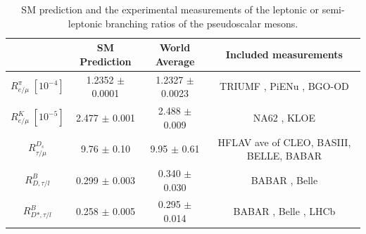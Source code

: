 \begin{table}[ht]
    \setlength{\tabcolsep}{.5 em}
    \renewcommand{\arraystretch}{1.5}
    \centering
    \begin{tabular}{|c|c|c|c|}
        \hline
         & SM Prediction & World Average & Included measurements \\
        \hline
        $R^\pi_{e/\mu} \; [10^{-4}]$ &  1.2352 $\pm$ 0.0001 \cite{Cirigliano:2007xi} & 1.2327 $\pm$ 0.0023  & 
            \tiny{ TRIUMF \cite{Numao:1992ve, Britton:1992pg}, PiENu \cite{Aguilar-Arevalo:2015cdf}, BGO-OD \cite{Czapek:1993kc}} \\
        $R^K_{e/\mu} \; [10^{-5}]$ &  2.477  $\pm$ 0.001 \cite{Cirigliano:2007xi} & 2.488  $\pm$ 0.009 & 
            \tiny{NA62 \cite{Lazzeroni:2012cx}, KLOE \cite{Ambrosino:2009aa} }\\
        $R^{D_s}_{\tau/\mu} $ &  9.76 $\pm$ 0.10 \cite{Dobrescu:2008er} & 9.95 $\pm$ 0.61  & 
            \tiny{ HFLAV \cite{Amhis:2016xyh} ave of CLEO, BASIII, BELLE, BABAR} \\
        
        \hline
        $R^{B}_{D, \tau/l} $ &  0.299  $\pm$ 0.003  \cite{Bifani:2018zmi} & 0.340  $\pm$ 0.030 & 
            \tiny{BABAR \cite{Lees:2012xj, Lees:2013uzd}, Belle \cite{Huschle:2015rga} }\\
            
        $R^{B}_{D*, \tau/l} $ &  0.258  $\pm$ 0.005 \cite{Bifani:2018zmi} & 0.295  $\pm$ 0.014 & 
            \tiny{BABAR \cite{Lees:2012xj, Lees:2013uzd}, Belle \cite{Huschle:2015rga, Sato:2016svk, Hirose:2016wfn}, LHCb\cite{Aaij:2015yra,Aaij:2017uff, Aaij:2017deq} }\\
            
        \hline
    \end{tabular}
    \caption{SM prediction and the experimental measurements of the leptonic or semi-leptonic branching ratios of the pseudoscalar mesons. \cite{Bifani:2018zmi} }
    \label{tab:relatedWorks:lu:meson:ratio}
\end{table}

